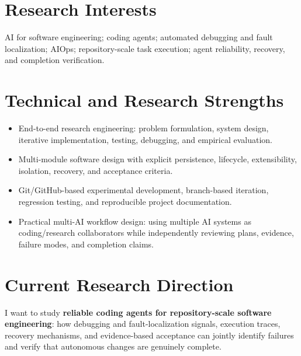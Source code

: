 \documentclass[10pt,a4paper]{article}
\begin{document}
\section{Research Interests}
AI for software engineering; coding agents; automated debugging and fault localization; AIOps; repository-scale task execution; agent reliability, recovery, and completion verification.

\section{Technical and Research Strengths}
\begin{itemize}
  \item End-to-end research engineering: problem formulation, system design, iterative implementation, testing, debugging, and empirical evaluation.
  \item Multi-module software design with explicit persistence, lifecycle, extensibility, isolation, recovery, and acceptance criteria.
  \item Git/GitHub-based experimental development, branch-based iteration, regression testing, and reproducible project documentation.
  \item Practical multi-AI workflow design: using multiple AI systems as coding/research collaborators while independently reviewing plans, evidence, failure modes, and completion claims.
\end{itemize}

\section{Current Research Direction}
I want to study \textbf{reliable coding agents for repository-scale software engineering}: how debugging and fault-localization signals, execution traces, recovery mechanisms, and evidence-based acceptance can jointly identify failures and verify that autonomous changes are genuinely complete.
\end{document}
